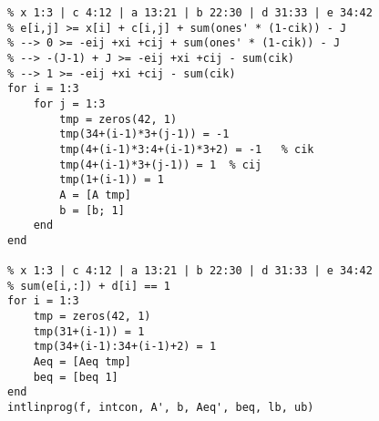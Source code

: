 \documentclass[onecolumn,times]{article}
\begin{document}
\begin{CJK}{UTF8}{gkai}
\begin{Verbatim}
% x 1:3 | c 4:12 | a 13:21 | b 22:30 | d 31:33 | e 34:42
% e[i,j] >= x[i] + c[i,j] + sum(ones' * (1-cik)) - J
% --> 0 >= -eij +xi +cij + sum(ones' * (1-cik)) - J
% --> -(J-1) + J >= -eij +xi +cij - sum(cik)
% --> 1 >= -eij +xi +cij - sum(cik)
for i = 1:3
	for j = 1:3
		tmp = zeros(42, 1)
		tmp(34+(i-1)*3+(j-1)) = -1
		tmp(4+(i-1)*3:4+(i-1)*3+2) = -1   % cik
		tmp(4+(i-1)*3+(j-1)) = 1  % cij
		tmp(1+(i-1)) = 1
		A = [A tmp]
		b = [b; 1]
	end
end

% x 1:3 | c 4:12 | a 13:21 | b 22:30 | d 31:33 | e 34:42
% sum(e[i,:]) + d[i] == 1
for i = 1:3
	tmp = zeros(42, 1)
	tmp(31+(i-1)) = 1
	tmp(34+(i-1):34+(i-1)+2) = 1
	Aeq = [Aeq tmp]
	beq = [beq 1]
end
intlinprog(f, intcon, A', b, Aeq', beq, lb, ub)

\end{Verbatim}

\end{CJK}
\end{document}
